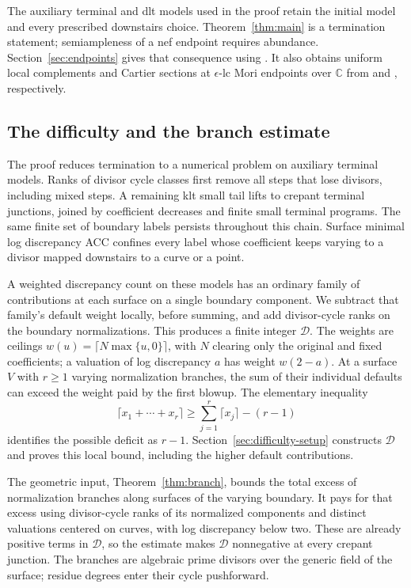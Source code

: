 The auxiliary terminal and dlt models used in the proof retain the
initial model and every prescribed downstairs choice.  Theorem~\ref{thm:main}
is a termination statement; semiampleness of a nef endpoint requires
abundance.  Section~\ref{sec:endpoints} gives that consequence using
\cite{OpenAILogAbundance2026}.  It also obtains uniform local complements
and Cartier sections at $\epsilon$-lc Mori endpoints over $\mathbb C$
from \cite{OpenAIComplements2026} and \cite{OpenAICartier2026}, respectively.

\subsection*{The difficulty and the branch estimate}

The proof reduces termination to a numerical problem on auxiliary
terminal models.  Ranks of divisor cycle classes first remove all
steps that lose divisors, including mixed steps.  A remaining klt
small tail lifts to crepant terminal junctions, joined by coefficient
decreases and finite small terminal programs.  The same finite set
of boundary labels persists throughout this chain.  Surface minimal
log discrepancy ACC confines every label whose coefficient keeps
varying to a divisor mapped downstairs to a curve or a point.

A weighted discrepancy count on these models has an ordinary family
of contributions at each surface on a single boundary component.
We subtract that family's default weight locally, before summing,
and add divisor-cycle ranks on the boundary normalizations.  This
produces a finite integer $\mathcal D$.  The weights are ceilings
\(w(u)=\lceil N\max\{u,0\}\rceil\), with $N$ clearing only the
original and fixed coefficients; a valuation of log discrepancy $a$
has weight $w(2-a)$.  At a surface $V$ with $r\geq1$ varying
normalization branches, the sum of their individual defaults can
exceed the weight paid by the first blowup.  The elementary inequality
\[
 \lceil x_1+\cdots+x_r\rceil
 \geq\sum_{j=1}^r\lceil x_j\rceil-(r-1)
\]
identifies the possible deficit as $r-1$.  Section~\ref{sec:difficulty-setup}
constructs $\mathcal D$ and proves this local bound, including the
higher default contributions.

The geometric input, Theorem~\ref{thm:branch}, bounds the total excess
of normalization branches along surfaces of the varying boundary.
It pays for that excess using divisor-cycle ranks of its normalized
components and distinct valuations centered on curves, with log
discrepancy below two.  These are already positive terms in
$\mathcal D$, so the estimate makes $\mathcal D$ nonnegative at every
crepant junction.  The branches are algebraic prime divisors over
the generic field of the surface; residue degrees enter their
cycle pushforward.

